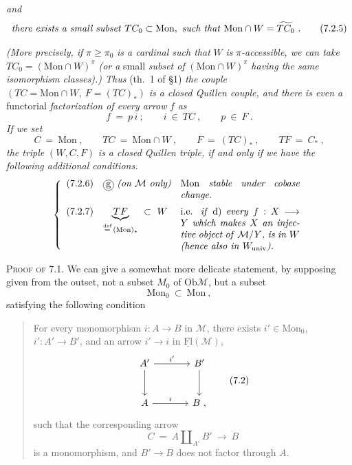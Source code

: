 \documentclass[11pt]{article}
\newcommand{\printedpage}[1]{\marginpar{\footnotesize p.~#1}}
\newcommand{\msp}[1]{\marginpar{\footnotesize [#1]}}
\newcommand{\Mon}{\mathrm{Mon}}
\newcommand{\Ob}{\mathrm{Ob}}
\newcommand{\Fl}{\mathrm{Fl}}
\newcommand{\cercle}[1]{\tikz[baseline=(c.base)]\node[draw,circle,inner sep=1pt](c){#1};}
\begin{document}
\printedpage{49}

\textit{and}
\[
\text{\textit{there exists a small subset} } TC_0 \subset \Mon, \text{ \textit{such that} } \Mon \cap W = \widetilde{TC_0}\ . \tag*{(7.2.5)} %
\]

\textit{(More precisely, if} $\pi \geq \pi_0$ \textit{is a cardinal such that} $W$ \textit{is} $\pi$\textit{-accessible, we can take} $TC_0 = (\Mon \cap W)^{\pi}$ \textit{(or a} small \textit{subset of} $(\Mon \cap W)^{\pi}$ \textit{having the same isomorphism classes).) Thus} (th.~1 of §1) \textit{the couple} $(TC = \Mon \cap W,\ F = (TC)_*)$ \textit{is a closed Quillen couple, and there is even a} functorial \textit{factorization of every arrow} $f$ \textit{as}
\[
f \ = \ p\, i \ ; \qquad i \ \in \ TC \ , \qquad p \ \in \ F \ . \tag*{(7.2.4)}
\]
\textit{If we set}
\[
C \ = \ \Mon \ , \qquad TC \ = \ \Mon \cap W \ , \qquad F \ = \ (TC)_* \ , \qquad TF \ = \ C_* \ , \tag*{(7.2.5)}
\]
\textit{the triple} $(W, C, F)$ \textit{is a closed Quillen triple, if and only if we have the following additional conditions.}
\[
\left\{
\begin{array}{lll}
\text{(7.2.6)} & \cercle{g}\ \text{\textit{(on $\mathcal{M}$ only)}} & \parbox[t]{0.36\textwidth}{Mon \textit{stable under cobase change.}} \\[4ex]
\text{(7.2.7)} & \underbrace{TF}_{\overset{\text{def}}{=}\,(\Mon)_*} \ \subset \ W & \parbox[t]{0.36\textwidth}{i.e. \textit{if} d) \textit{every} $f : X \longrightarrow Y$ \textit{which makes} $X$ \textit{an injective object of} $\mathcal{M}/Y$\textit{, is in} $W$ \textit{(hence also in} $W_{\mathrm{univ}}$\textit{).}}
\end{array}
\right.
\]

\msp{page 90}

\textsc{Proof of} 7.1. We can give a somewhat more delicate statement, by supposing given from the outset, not a subset $M_0$ of $\Ob \mathcal{M}$, but a subset
\[
\Mon_0 \ \subset \ \Mon \ , \tag*{(7.1)}
\]
satisfying the following condition

\begin{quote}
For every monomorphism $i : A \longrightarrow B$ in $\mathcal{M}$, there exists $i' \in \Mon_0$, $i' : A' \longrightarrow B'$, and an arrow $i' \longrightarrow i$ in $\underline{\Fl}(\mathcal{M})$,
\[
\begin{tikzcd}[row sep=large, column sep=large]
A' \arrow[r, "{i'}"] \arrow[d] & B' \arrow[d] \\
A \arrow[r, "i"] & B \ ,
\end{tikzcd}
\tag*{(7.2)}
\]
such that the corresponding arrow
\[
C \ = \ A \amalg_{A'} B' \ \longrightarrow \ B
\]
is a monomorphism, and $B' \longrightarrow B$ does not factor through $A$.
\end{quote}
\end{document}
